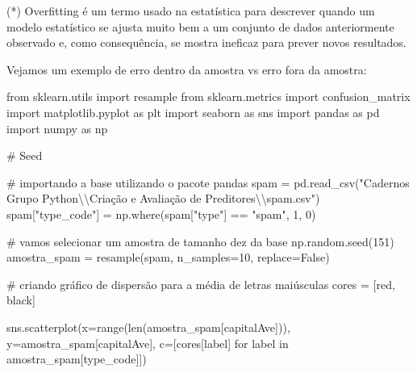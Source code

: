 \documentclass[
  letterpaper,
  DIV=11,
  numbers=noendperiod]{scrreprt}
\newenvironment{Shaded}{\begin{snugshade}}{\end{snugshade}}
\newcommand{\BuiltInTok}[1]{\textcolor[rgb]{0.00,0.23,0.31}{#1}}
\newcommand{\CharTok}[1]{\textcolor[rgb]{0.13,0.47,0.30}{#1}}
\newcommand{\CommentTok}[1]{\textcolor[rgb]{0.37,0.37,0.37}{#1}}
\newcommand{\ControlFlowTok}[1]{\textcolor[rgb]{0.00,0.23,0.31}{#1}}
\newcommand{\DecValTok}[1]{\textcolor[rgb]{0.68,0.00,0.00}{#1}}
\newcommand{\ImportTok}[1]{\textcolor[rgb]{0.00,0.46,0.62}{#1}}
\newcommand{\KeywordTok}[1]{\textcolor[rgb]{0.00,0.23,0.31}{#1}}
\newcommand{\NormalTok}[1]{\textcolor[rgb]{0.00,0.23,0.31}{#1}}
\newcommand{\OperatorTok}[1]{\textcolor[rgb]{0.37,0.37,0.37}{#1}}
\newcommand{\StringTok}[1]{\textcolor[rgb]{0.13,0.47,0.30}{#1}}
\newcommand{\VariableTok}[1]{\textcolor[rgb]{0.07,0.07,0.07}{#1}}
\begin{document}
(*) Overfitting é um termo usado na estatística para descrever quando um
modelo estatístico se ajusta muito bem a um conjunto de dados
anteriormente observado e, como consequência, se mostra ineficaz para
prever novos resultados.

Vejamos um exemplo de erro dentro da amostra vs erro fora da amostra:

\begin{Shaded}
\begin{Highlighting}[]
\ImportTok{from}\NormalTok{ sklearn.utils }\ImportTok{import}\NormalTok{ resample}
\ImportTok{from}\NormalTok{ sklearn.metrics }\ImportTok{import}\NormalTok{ confusion\_matrix}
\ImportTok{import}\NormalTok{ matplotlib.pyplot }\ImportTok{as}\NormalTok{ plt}
\ImportTok{import}\NormalTok{ seaborn }\ImportTok{as}\NormalTok{ sns}
\ImportTok{import}\NormalTok{ pandas }\ImportTok{as}\NormalTok{ pd}
\ImportTok{import}\NormalTok{ numpy }\ImportTok{as}\NormalTok{ np}

\CommentTok{\# Seed}


\CommentTok{\# importando a base utilizando o pacote pandas}
\NormalTok{spam }\OperatorTok{=}\NormalTok{ pd.read\_csv(}\StringTok{"Cadernos Grupo Python}\CharTok{\textbackslash{}\textbackslash{}}\StringTok{Criação e Avaliação de Preditores}\CharTok{\textbackslash{}\textbackslash{}}\StringTok{spam.csv"}\NormalTok{)}
\NormalTok{spam[}\StringTok{"type\_code"}\NormalTok{] }\OperatorTok{=}\NormalTok{ np.where(spam[}\StringTok{"type"}\NormalTok{] }\OperatorTok{==} \StringTok{"spam"}\NormalTok{, }\DecValTok{1}\NormalTok{, }\DecValTok{0}\NormalTok{)}

\CommentTok{\# vamos selecionar um amostra de tamanho dez da base}
\NormalTok{np.random.seed(}\DecValTok{151}\NormalTok{)}
\NormalTok{amostra\_spam }\OperatorTok{=}\NormalTok{ resample(spam, n\_samples}\OperatorTok{=}\DecValTok{10}\NormalTok{, replace}\OperatorTok{=}\VariableTok{False}\NormalTok{)}

\CommentTok{\# criando gráfico de dispersão para a média de letras maiúsculas}
\NormalTok{cores }\OperatorTok{=}\NormalTok{ [}\StringTok{\textquotesingle{}red\textquotesingle{}}\NormalTok{, }\StringTok{\textquotesingle{}black\textquotesingle{}}\NormalTok{]}

\NormalTok{sns.scatterplot(x}\OperatorTok{=}\BuiltInTok{range}\NormalTok{(}\BuiltInTok{len}\NormalTok{(amostra\_spam[}\StringTok{\textquotesingle{}capitalAve\textquotesingle{}}\NormalTok{])),}
\NormalTok{                y}\OperatorTok{=}\NormalTok{amostra\_spam[}\StringTok{\textquotesingle{}capitalAve\textquotesingle{}}\NormalTok{],}
\NormalTok{                c}\OperatorTok{=}\NormalTok{[cores[label] }\ControlFlowTok{for}\NormalTok{ label }\KeywordTok{in}\NormalTok{ amostra\_spam[}\StringTok{\textquotesingle{}type\_code\textquotesingle{}}\NormalTok{]])}


\end{Highlighting}
\end{Shaded}
\end{document}
